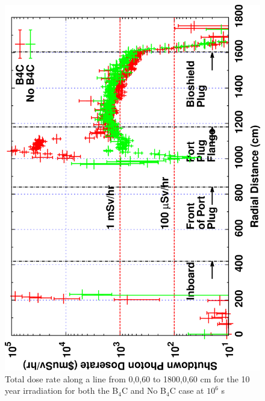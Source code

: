 \documentclass[12pt]{article}
\begin{document}
\begin{figure}[ht!]
\centering
\includegraphics[clip,scale=0.12,angle=-90]{../plots/photon_lineout/comp/10yr_dc2.png}
\caption{Total dose rate along a line from 0,0,60 to 1800,0,60 cm for the 10 year irradiation
for both the B$_4$C and No B$_4$C case at $10^6$ s}
\label{fig:photons_10y_dc2_dose}
\end{figure}
\newpage
\end{document}
